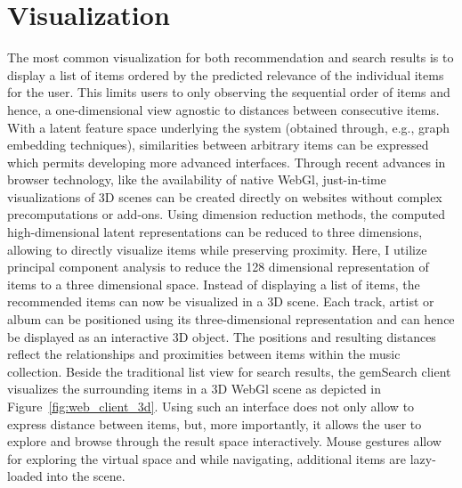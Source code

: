 \documentclass[sigconf]{acmart}
\begin{document}
\section{Visualization}
The most common visualization for both recommendation and search results is to display a list of items ordered by the predicted relevance of the individual items for the user. This limits users to only observing the sequential order of items and hence, a one-dimensional view agnostic to distances between consecutive items. With a latent feature space underlying the system (obtained through, e.g., graph embedding techniques), similarities between arbitrary items can be expressed which permits developing more advanced interfaces. Through recent advances in browser technology, like the availability of native WebGl, just-in-time visualizations of 3D scenes can be created directly on websites without complex precomputations or add-ons. 
Using dimension reduction methods, the computed high-dimensional latent representations can be reduced to three dimensions, allowing to directly visualize items while preserving proximity. Here, I utilize principal component analysis to reduce the 128 dimensional representation of items to a three dimensional space. Instead of displaying a list of items, the recommended items can now be visualized in a 3D scene. Each track, artist or album can be positioned using its three-dimensional representation and can hence be displayed as an interactive 3D object. The positions and resulting distances reflect the relationships and proximities between items within the music collection. Beside the traditional list view for search results, the gemSearch client visualizes the surrounding items in a 3D WebGl scene as depicted in Figure~\ref{fig:web_client_3d}. Using such an interface does not only allow to express distance between items, but, more importantly, it allows the user to explore and browse through the result space interactively. Mouse gestures allow for exploring the virtual space and while navigating, additional items are lazy-loaded into the scene. 
\end{document}
